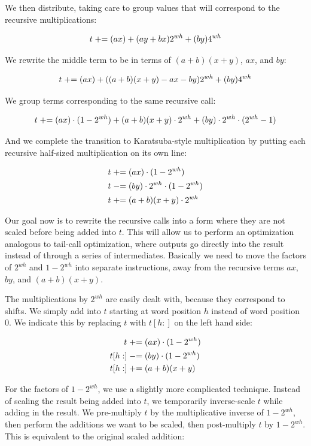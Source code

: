 \documentclass[onecolumn]{quantumarticle}
\begin{document}
We then distribute, taking care to group values that will correspond to the recursive multiplications:

$$t \mathrel{+}= (ax) + (ay + bx) 2^{wh} + (by)4^{wh}$$

We rewrite the middle term to be in terms of $(a+b)(x + y)$, $ax$, and $by$:

$$t \mathrel{+}= (ax) + ((a+b)(x + y) - ax - by) 2^{wh} + (by)4^{wh}$$

We group terms corresponding to the same recursive call:

$$t \mathrel{+}= (ax) \cdot (1 - 2^{wh}) + (a+b)(x + y) \cdot 2^{wh} + (by) \cdot 2^{wh} \cdot (2^{wh}-1)$$

And we complete the transition to Karatsuba-style multiplication by putting each recursive half-sized multiplication on its own line:

$$\begin{aligned}
t &\mathrel{+}= (ax) \cdot (1 - 2^{wh})
\\
t &\mathrel{-}= (by) \cdot 2^{wh} \cdot (1-2^{wh})
\\
t &\mathrel{+}= (a+b)(x + y) \cdot 2^{wh}
\end{aligned}$$

Our goal now is to rewrite the recursive calls into a form where they are not scaled before being added into $t$.
This will allow us to perform an optimization analogous to tail-call optimization, where outputs go directly into the result instead of through a series of intermediates.
Basically we need to move the factors of $2^{wh}$ and $1-2^{wh}$ into separate instructions, away from the recursive terms $ax$, $by$, and $(a+b)(x+y)$.

The multiplications by $2^{wh}$ are easily dealt with, because they correspond to shifts.
We simply add into $t$ starting at word position $h$ instead of word position 0.
We indicate this by replacing $t$ with $t[h:]$ on the left hand side:

$$\begin{aligned}
t &\mathrel{+}= (ax) \cdot (1 - 2^{wh})
\\
t[h:] &\mathrel{-}= (by) \cdot (1 - 2^{wh})
\\
t[h:] &\mathrel{+}= (a+b)(x + y)
\end{aligned}$$

For the factors of $1-2^{wh}$, we use a slightly more complicated technique.
Instead of scaling the result being added into $t$, we temporarily inverse-scale $t$ while adding in the result.
We pre-multiply $t$ by the multiplicative inverse of $1 - 2^{wh}$, then perform the additions we want to be scaled, then post-multiply $t$ by $1 - 2^{wh}$.
This is equivalent to the original scaled addition:
\end{document}
